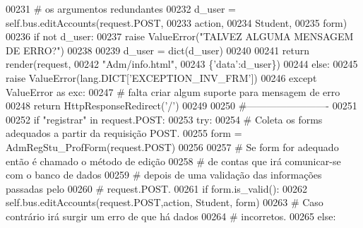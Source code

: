 \begin{DoxyCode}
{}
00231                         \textcolor{comment}{# os argumentos redundantes
}
00232                         d\_user = self.bus.editAccounts(request.POST,
00233                                                         action,
00234                                                         Student,
00235                                                         form)
00236                         \textcolor{keywordflow}{if} \textcolor{keywordflow}{not} d\_user:
00237                             \textcolor{keywordflow}{raise} ValueError(\textcolor{stringliteral}{"TALVEZ ALGUMA MENSAGEM DE ERRO?"})
00238 
00239                         d\_user = dict(d\_user)
00240 
00241                         \textcolor{keywordflow}{return} render(request, 
00242                                       \textcolor{stringliteral}{"Adm/info.html"}, 
00243                                       \{\textcolor{stringliteral}{'data'}:d\_user\})
00244                     \textcolor{keywordflow}{else}:
00245                         \textcolor{keywordflow}{raise} ValueError(lang.DICT[\textcolor{stringliteral}{'EXCEPTION\_INV\_FRM'}])
00246                 \textcolor{keywordflow}{except} ValueError \textcolor{keyword}{as} exc:
00247                     \textcolor{comment}{# falta criar algum suporte para mensagem de erro
}
00248                     \textcolor{keywordflow}{return} HttpResponseRedirect(\textcolor{stringliteral}{'/'})
00249 
00250             \textcolor{comment}{#-------------------------
}
00251 
00252             \textcolor{keywordflow}{if} \textcolor{stringliteral}{"registrar"} \textcolor{keywordflow}{in} request.POST:
00253                 \textcolor{keywordflow}{try}:
00254                     \textcolor{comment}{# Coleta os forms adequados a partir da requisição POST.
}
00255                     form = AdmRegStu\_ProfForm(request.POST)
00256 
00257                     \textcolor{comment}{# Se form for adequado então é chamado o método de edição 
}
00258                     \textcolor{comment}{#   de contas que irá comunicar-se com o banco de dados 
}
00259                     \textcolor{comment}{#   depois de uma validação das informações passadas pelo
}
00260                     \textcolor{comment}{#   request.POST.
}
00261                     \textcolor{keywordflow}{if} form.is\_valid():
00262                         self.bus.editAccounts(request.POST,action, Student, form)
00263                     \textcolor{comment}{# Caso contrário irá surgir um erro de que há dados
}
00264                     \textcolor{comment}{#   incorretos.
}
00265                     \textcolor{keywordflow}{else}:

\end{DoxyCode}
